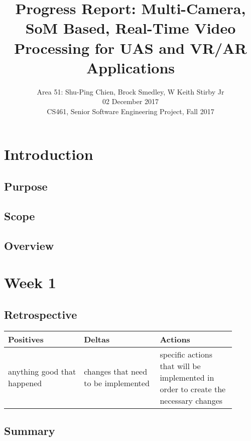 \documentclass[letterpaper,10pt,serif,draftclsnofoot,onecolumn,compsoc,titlepage]{IEEEtran}
\title{Progress Report: Multi-Camera, SoM Based, Real-Time Video Processing for UAS and VR/AR Applications}
\author{Area 51: Shu-Ping Chien, Brock Smedley, W Keith Stirby Jr \\ 02 December 2017 \\ CS461, Senior Software Engineering Project, Fall 2017}
\begin{document}
\begin{titlepage}
\maketitle

\begin{abstract}


\thispagestyle{empty}
\end{abstract}
\end{titlepage}


\newpage

\section{Introduction}

\subsection{Purpose}


\subsection{Scope}


\subsection{Overview}

\section{Week 1}
\subsection{Retrospective}

\begin{tabular}{|p{0.3\linewidth}|p{0.3\linewidth}|p{0.3\linewidth}|}
   \hline
   \textbf{Positives} & \textbf{Deltas} & \textbf{Actions}\\ 
   \hline
   anything good that happened & changes that need to be implemented & specific actions that will be implemented in order to create the necessary changes \\
   \hline
\end{tabular}

\subsection{Summary}
\end{document}
